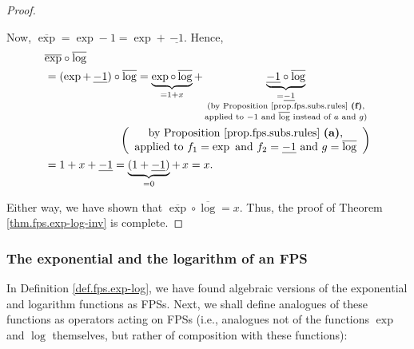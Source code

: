 \begin{proof}
\begin{itemize}
Now, $\overline{\exp}=\exp-1=\exp+\,\underline{-1}$. Hence,
\begin{align*}
&  \overline{\exp}\circ\overline{\log}\\
&  =\left(  \exp+\,\underline{-1}\right)  \circ\overline{\log}%
=\underbrace{\exp\circ\,\overline{\log}}_{=1+x}+\underbrace{\underline{-1}%
\circ\overline{\log}}_{\substack{=\underline{-1}\\\text{(by Proposition
\ref{prop.fps.subs.rules} \textbf{(f)},}\\\text{applied to }-1\text{ and
}\overline{\log}\text{ instead of }a\text{ and }g\text{)}}}\\
&  \ \ \ \ \ \ \ \ \ \ \ \ \ \ \ \ \ \ \ \ \left(
\begin{array}
[c]{c}%
\text{by Proposition \ref{prop.fps.subs.rules} \textbf{(a)},}\\
\text{applied to }f_{1}=\exp\text{ and }f_{2}=\underline{-1}\text{ and
}g=\overline{\log}%
\end{array}
\right) \\
&  =1+x+\underline{-1}=\underbrace{\left(  1+\underline{-1}\right)  }%
_{=0}+\,x=x.
\end{align*}

\end{itemize}

Either way, we have shown that $\overline{\exp}\circ\overline{\log}=x$. Thus,
the proof of Theorem \ref{thm.fps.exp-log-inv} is complete.
\end{proof}

\subsubsection{The exponential and the logarithm of an FPS}

In Definition \ref{def.fps.exp-log}, we have found algebraic versions of the
exponential and logarithm functions as FPSs. Next, we shall define analogues
of these functions as operators acting on FPSs (i.e., analogues not of the
functions $\exp$ and $\log$ themselves, but rather of composition with these functions):

